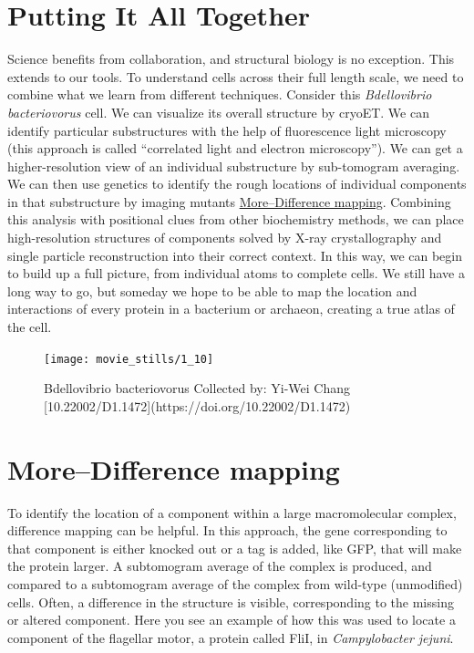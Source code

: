 \documentclass[]{tufte-book}
\begin{document}
\section{Putting It All Together}\label{putting-it-all-together}

Science benefits from collaboration, and structural biology is no
exception. This extends to our tools. To understand cells across their
full length scale, we need to combine what we learn from different
techniques. Consider this \emph{Bdellovibrio bacteriovorus} cell. We can
visualize its overall structure by cryoET. We can identify particular
substructures with the help of fluorescence light microscopy (this
approach is called ``correlated light and electron microscopy''). We can
get a higher-resolution view of an individual substructure by
sub-tomogram averaging. We can then use genetics to identify the rough
locations of individual components in that substructure by imaging
mutants \protect\hyperlink{moredifference-mapping}{More--Difference
mapping}. Combining this analysis with positional clues from other
biochemistry methods, we can place high-resolution structures of
components solved by X-ray crystallography and single particle
reconstruction into their correct context. In this way, we can begin to
build up a full picture, from individual atoms to complete cells. We
still have a long way to go, but someday we hope to be able to map the
location and interactions of every protein in a bacterium or archaeon,
creating a true atlas of the cell.

\begin{figure}
\texttt{[image: movie\_stills/1\_10]} \caption[Bdellovibrio bacteriovorus Collected by]{Bdellovibrio bacteriovorus Collected by: Yi-Wei Chang [10.22002/D1.1472](https://doi.org/10.22002/D1.1472)}\label{fig:unnamed-chunk-15}
\end{figure}

\hypertarget{moredifference-mapping}{\section{More--Difference
mapping}\label{moredifference-mapping}}

To identify the location of a component within a large macromolecular
complex, difference mapping can be helpful. In this approach, the gene
corresponding to that component is either knocked out or a tag is added,
like GFP, that will make the protein larger. A subtomogram average of
the complex is produced, and compared to a subtomogram average of the
complex from wild-type (unmodified) cells. Often, a difference in the
structure is visible, corresponding to the missing or altered component.
Here you see an example of how this was used to locate a component of
the flagellar motor, a protein called FliI, in \emph{Campylobacter
jejuni}.
\end{document}
